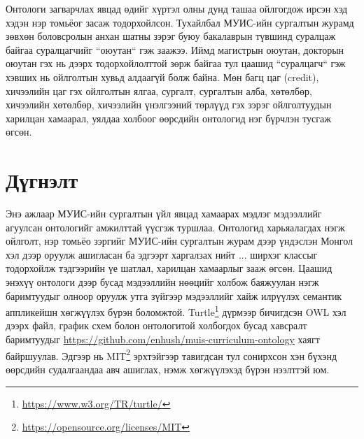 \documentclass[conference, a4paper, mongolian]{myIEEEtran}
\begin{document}
Онтологи загварчлах явцад өдийг хүртэл олны дунд ташаа ойлгогдож ирсэн хэд хэдэн нэр томьёог засаж тодорхойлсон. Тухайлбал МУИС-ийн сургалтын журамд зөвхөн боловсролын анхан шатны зэрэг буюу бакалаврын түвшинд суралцаж байгаа суралцагчийг ``оюутан`` гэж заажээ. Иймд магистрын оюутан, докторын оюутан гэх нь дээрх тодорхойлолттой зөрж байгаа тул цаашид ``суралцагч`` гэж хэвших нь ойлголтын хувьд алдаагүй болж байна. Мөн багц цаг (credit), хичээлийн цаг гэх ойлголтын ялгаа, сургалт, сургалтын алба, хөтөлбөр, хичээлийн хөтөлбөр, хичээлийн үнэлгээний төрлүүд гэх зэрэг ойлголтуудын харилцан хамаарал, уялдаа холбоог өөрсдийн онтологид нэг бүрчлэн тусгаж өгсөн.
%
\section{Дүгнэлт}
%
Энэ ажлаар МУИС-ийн сургалтын үйл явцад хамаарах мэдлэг мэдээллийг агуулсан онтологийг амжилттай үүсгэж туршлаа. Онтологид харьяалагдах нэгж ойлголт, нэр томьёо зэргийг МУИС-ийн сургалтын журам дээр үндэслэн Монгол хэл дээр оруулж ашигласан ба эдгээрт харгалзах нийт ... ширхэг классыг тодорхойлж тэдгээрийн үе шатлал, харилцан хамаарлыг зааж өгсөн. Цаашид энэхүү онтологи дээр бусад мэдээллийн нөөцийг холбож баяжуулан нэгж баримтуудыг олноор оруулж утга зүйгээр мэдээллийг хайж илрүүлэх семантик аппликейшн хөгжүүлэх бүрэн боломжтой. Turtle\footnote{\url{https://www.w3.org/TR/turtle/}} дүрмээр бичигдсэн OWL хэл дээрх файл, график схем болон онтологитой холбогдох бусад хавсралт баримтуудыг \url{https://github.com/enhush/muis-curriculum-ontology} хаягт байршуулав. Эдгээр нь MIT\footnote{\url{https://opensource.org/licenses/MIT}} эрхтэйгээр тавигдсан тул сонирхсон хэн бүхэнд өөрсдийн судалгаандаа авч ашиглах, нэмж хөгжүүлэхэд бүрэн нээлттэй юм.
%
\end{document}

